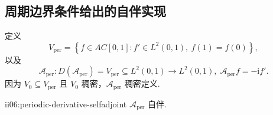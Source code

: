 \subsection{周期边界条件给出的自伴实现}

定义
\[
V_{\mathrm{per}}
=
\left\{
 f\in AC[0,1]:f'\in L^2(0,1),\ f(1)=f(0)
\right\},
\]
以及
\[
\mathcal A_{\mathrm{per}}:
D(\mathcal A_{\mathrm{per}})=V_{\mathrm{per}}
\subseteq L^2(0,1)
\to L^2(0,1),
\;
\mathcal A_{\mathrm{per}}f=-\mathrm{i}f'.
\]
因为 \(\displaystyle V_0\subseteq V_{\mathrm{per}}\) 且 \(\displaystyle V_0\) 稠密，\(\displaystyle\mathcal A_{\mathrm{per}}\) 稠密定义.

\begin{FAProposition}[B][周期一阶微分算子自伴]{ii06:periodic-derivative-selfadjoint}
\(\displaystyle\mathcal A_{\mathrm{per}}\) 自伴.
\end{FAProposition}

